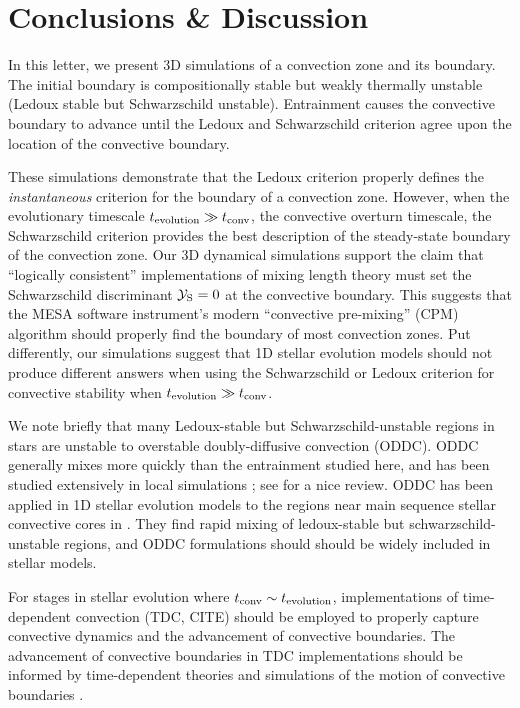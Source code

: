 \section{Conclusions \& Discussion}
\label{sec:conclusions}

In this letter, we present 3D simulations of a convection zone and its boundary.
The initial boundary is compositionally stable but weakly thermally unstable (Ledoux stable but Schwarzschild unstable).
Entrainment causes the convective boundary to advance until the Ledoux and Schwarzschild criterion agree upon the location of the convective boundary.

These simulations demonstrate that the Ledoux criterion properly defines the \emph{instantaneous} criterion for the boundary of a convection zone.
However, when the evolutionary timescale $t_{\rm{evolution}} \gg t_{\rm{conv}}$, the convective overturn timescale, the Schwarzschild criterion provides the best description of the steady-state boundary of the convection zone.
Our 3D dynamical simulations support the claim that ``logically consistent'' implementations of mixing length theory \citep{gabriel_etal_2014, mesa4, mesa5} must set the Schwarzschild discriminant $\mathcal{Y}_{\rm{S}} = 0$ at the convective boundary.
This suggests that the MESA software instrument's modern ``convective pre-mixing'' (CPM) algorithm should properly find the boundary of most convection zones.
Put differently, our simulations suggest that 1D stellar evolution models should not produce different answers when using the Schwarzschild or Ledoux criterion for convective stability when $t_{\rm{evolution}} \gg t_{\rm{conv}}$.

We note briefly that many Ledoux-stable but Schwarzschild-unstable regions in stars are unstable to overstable doubly-diffusive convection (ODDC).
ODDC generally mixes more quickly than the entrainment studied here, and has been studied extensively in local simulations \citep{mirouh_etal_2012, wood_etal_2013, xie_etal_2017}; see \citet{garaud_2018} for a nice review.
ODDC has been applied in 1D stellar evolution models to the regions near main sequence stellar convective cores in \citet{moore_garaud_2016}.
They find rapid mixing of ledoux-stable but schwarzschild-unstable regions, and ODDC formulations should should be widely included in stellar models.

For stages in stellar evolution where $t_{\rm{conv}} \sim t_{\rm{evolution}}$, implementations of time-dependent convection (TDC, CITE) should be employed to properly capture convective dynamics and the advancement of convective boundaries.
The advancement of convective boundaries in TDC implementations should be informed by time-dependent theories and simulations of the motion of convective boundaries \citep[e.g.,][]{turner_1968, fuentes_cumming_2020}.

